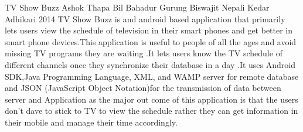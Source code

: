  \begin{conf-abstract}[]
{TV Show Buzz}
{Ashok Thapa
Bil Bahadur Gurung
Biswajit Nepali
Kedar Adhikari}
{2014}
TV Show Buzz is and android based application that primarily lets users view the schedule of television in their smart phones and get better in smart phone devices.This application is useful to people of all the ages and avoid missing TV programs they are waiting .It lets users know the TV schedule of different channels once they synchronize their database in a day .It uses Android SDK,Java Programming Language, XML, and WAMP server for remote database and JSON (JavaScript Object Notation)for the transmission of data between server and Application as the major out come of this application is that the users don't dave to stick to TV to view the schedule rather they can get information in their mobile and manage their time accordingly.
  \end{conf-abstract}